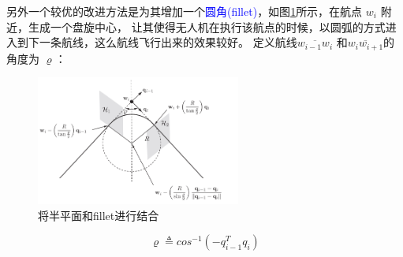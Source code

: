     另外一个较优的改进方法是为其增加一个\textcolor{blue}{圆角(fillet)}，如图\ref{fig:algor6}所示，在航点 $w_{i}$ 附近，生成一个盘旋中心，
 让其使得无人机在执行该航点的时候，以圆弧的方式进入到下一条航线，这么航线飞行出来的效果较好。
 定义航线$\overline{w_{i-1}w_{i}}$ 和$\overline{w_{i}w_{i+1}}$的角度为 $\varrho$：
 \begin{figure}[h]
    \centering
    \includegraphics[width=0.6\textwidth]{pictures/algo6_3.png}
    \caption{将半平面和fillet进行结合}
    \label{fig:algor6}
\end{figure}
    \begin{equation}
        \varrho \triangleq cos^{-1}(-q_{i-1}^{T}q_{i})
    \end{equation}
    
